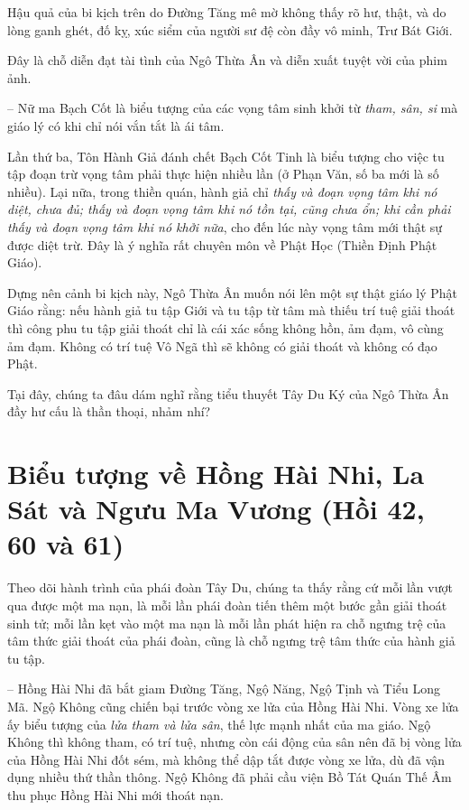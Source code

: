 Hậu quả của bi kịch trên do Đường Tăng mê mờ không thấy rõ hư, thật, và do lòng ganh ghét, đố kỵ, xúc siểm của người sư đệ còn đầy vô minh, Trư Bát Giới.

Đây là chỗ diễn đạt tài tình của Ngô Thừa Ân và diễn xuất tuyệt vời của phim ảnh.

-- Nữ ma Bạch Cốt là biểu tượng của các vọng tâm sinh khởi từ \emph{tham, sân, si} mà giáo lý có khi chỉ nói vắn tắt là ái tâm.

Lần thứ ba, Tôn Hành Giả đánh chết Bạch Cốt Tinh là biểu tượng cho việc tu tập đoạn trừ vọng tâm phải thực hiện nhiều lần (ở Phạn Văn, số ba mới là số nhiều). Lại nữa, trong thiền quán, hành giả chỉ \emph{thấy và đoạn vọng tâm khi nó diệt, chưa đủ; thấy và đoạn vọng tâm khi nó tồn tại, cũng chưa ổn; khi cần phải thấy và đoạn vọng tâm khi nó khởi nữa}, cho đến lúc này vọng tâm mới thật sự được diệt trừ. Đây là ý nghĩa rất chuyên môn về Phật Học (Thiền Định Phật Giáo).

Dựng nên cảnh bi kịch này, Ngô Thừa Ân muốn nói lên một sự thật giáo lý Phật Giáo rằng: nếu hành giả tu tập Giới và tu tập từ tâm mà thiếu trí tuệ giải thoát thì công phu tu tập giải thoát chỉ là cái xác sống không hồn, ảm đạm, vô cùng ảm đạm. Không có trí tuệ Vô Ngã thì sẽ không có giải thoát và không có đạo Phật.

Tại đây, chúng ta đâu dám nghĩ rằng tiểu thuyết Tây Du Ký của Ngô Thừa Ân đầy hư cấu là thần thoại, nhảm nhí?


\section{Biểu tượng về Hồng Hài Nhi, La Sát và Ngưu Ma Vương (Hồi 42, 60 và 61)} %
\label{sec:bieu_tuong_ve_hong_hai_nhi_va_nguu_ma_vuong}

Theo dõi hành trình của phái đoàn Tây Du, chúng ta thấy rằng cứ mỗi lần vượt qua được một ma nạn, là mỗi lần phái đoàn tiến thêm một bước gần giải thoát sinh tử; mỗi lần kẹt vào một ma nạn là mỗi lần phát hiện ra chỗ ngưng trệ của tâm thức giải thoát của phái đoàn, cũng là chỗ ngưng trệ tâm thức của hành giả tu tập.

-- Hồng Hài Nhi đã bắt giam Đường Tăng, Ngộ Năng, Ngộ Tịnh và Tiểu Long Mã. Ngộ Không cũng chiến bại trước vòng xe lửa của Hồng Hài Nhi. Vòng xe lửa ấy biểu tượng của \emph{lửa tham và lửa sân}, thế lực mạnh nhất của ma giáo. Ngộ Không thì không tham, có trí tuệ, nhưng còn cái động của sân nên đã bị vòng lửa của Hồng Hài Nhi đốt sém, mà không thể dập tắt được vòng xe lửa, dù đã vận dụng nhiều thứ thần thông. Ngộ Không đã phải cầu viện Bồ Tát Quán Thế Âm thu phục Hồng Hài Nhi mới thoát nạn.

